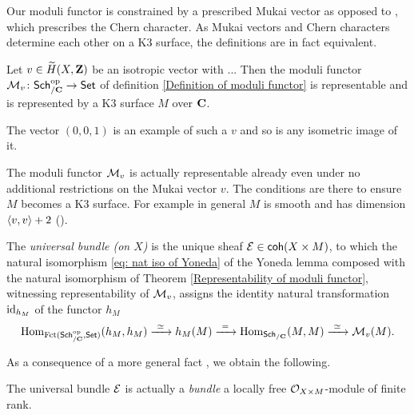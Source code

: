 \begin{remark}
    Our moduli functor is constrained by a prescribed Mukai vector as opposed to \cite[text]{keylist}, which prescribes the Chern character. As Mukai vectors and Chern characters determine each other on a K3 surface, the definitions are in fact equivalent. 
\end{remark}

\begin{theorem}
    \label{Representability of moduli functor}
    Let $v \in \widetilde{H}(X, \mathbf Z)$ be an isotropic vector with ... Then the moduli functor $\mathcal M_v \colon \mathsf{Sch}_{/\mathbf C}^{\text{op}} \to \mathsf{Set}$ of definition \ref{Definition of moduli functor} is representable and is represented by a K3 surface $M$ over $\mathbf C$.
\end{theorem}

\begin{example}
    The vector $(0,0,1)$ is an example of such a $v$ and so is any isometric image of it. 
\end{example}

\begin{remark}
    The moduli functor $\mathcal M_v$ is actually representable already even under no additional restrictions on the Mukai vector $v$. The conditions are there to ensure $M$ becomes a K3 surface. For example in general $M$ is smooth and has dimension $\langle v, v \rangle + 2$ (\cf \cite[\S 4.3, Propositon 4.20]{vanBree2020}).
\end{remark}

\begin{definition}
    The \emph{universal bundle (on $X$)} is the unique sheaf $\mathcal E \in \mathsf{coh}(X \times M)$, to which the natural isomorphism \eqref{eq: nat iso of Yoneda} of the Yoneda lemma composed with the natural isomorphism of Theorem \ref{Representability of moduli functor}, witnessing representability of $\mathcal M_v$, assigns the identity natural transformation $\operatorname{id}_{h_M}$ of the functor $h_M$
    \[
        \operatorname{Hom}_{\operatorname{Fct(\mathsf{Sch}_{/\mathbf C}^{\text{op}}, \mathsf{Set})}}(h_M, h_M) \xrightarrow{\ \simeq\ } h_M(M) \xrightarrow{\ = \ } \operatorname{Hom}_{\mathsf{Sch}_{/\mathbf C}}(M, M) \xrightarrow{\ \simeq\ } \mathcal M_v(M).
    \]
\end{definition}

As a consequence of a more general fact \cite[text]{keylist}, we obtain the following. 

\begin{theorem}
    The universal bundle $\mathcal E$ is actually a \emph{bundle} \ie a locally free $\mathcal{O}_{X \times M}$-module of finite rank. 
\end{theorem}


